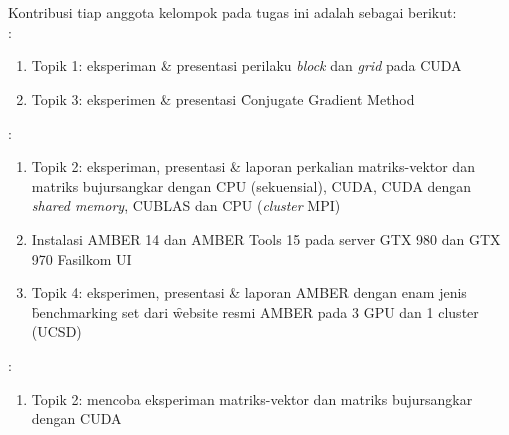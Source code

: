 \chapter{\kontribusi}
Kontribusi tiap anggota kelompok pada tugas ini adalah sebagai berikut: \\[8pt]

:
\begin{enumerate}
	\item Topik 1: eksperiman \& presentasi perilaku \textit{block} dan \textit{grid} pada CUDA
	\item Topik 3: eksperimen \& presentasi \f{Conjugate Gradient Method}
\end{enumerate}

:
\begin{enumerate}	
	\item Topik 2: eksperiman, presentasi \& laporan perkalian matriks-vektor dan matriks bujursangkar dengan CPU (sekuensial), CUDA, CUDA dengan \textit{shared memory}, CUBLAS dan CPU (\textit{cluster} MPI)
	\item Instalasi AMBER 14 dan AMBER Tools 15 pada server GTX 980 dan GTX 970 Fasilkom UI
	\item Topik 4: eksperimen, presentasi \& laporan AMBER dengan enam jenis \f{benchmarking set} dari \f{website} resmi AMBER pada 3 GPU dan 1 cluster (UCSD)
\end{enumerate}

:
\begin{enumerate}
	\item Topik 2: mencoba eksperiman matriks-vektor dan matriks bujursangkar dengan CUDA
\end{enumerate}
